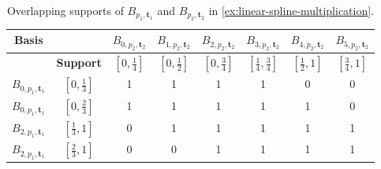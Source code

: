 \begin{example}
    \begin{table}[H]
        \centering
        \begin{tabular}{c|c||c|c|c|c|c|c}
            \textbf{Basis} &  & $B_{0, p_2, \mathbf{t}_2}$ & $B_{1, p_2, \mathbf{t}_2}$ & $B_{2, p_2, \mathbf{t}_2}$ & $B_{3, p_2, \mathbf{t}_2}$ & $B_{4, p_2, \mathbf{t}_2}$ & $B_{5, p_2, \mathbf{t}_2}$ \\[5pt]
            \hline
            \rule{0pt}{2.5ex} & \textbf{Support} & $\left[0, \frac{1}{4}\right]$ & $\left[0, \frac{1}{2}\right]$ & $\left[0, \frac{3}{4}\right]$ & $\left[\frac{1}{4}, \frac{3}{4}\right]$ & $\left[\frac{1}{2}, 1\right]$ & $\left[\frac{3}{4}, 1\right]$ \\[5pt]
            \hline\hline
            \rule{0pt}{2.5ex}$B_{0, p_1, \mathbf{t}_1}$ & $\left[0, \frac{1}{3}\right]$ & 
            1 & 1 & 1 & 1 & 0 & 0 \\[5pt]\hline\rule{0pt}{2.5ex}
            $B_{0, p_1, \mathbf{t}_1}$ & $\left[0, \frac{2}{3}\right]$ &
            1 & 1 & 1 & 1 & 1 & 0 \\[5pt]\hline\rule{0pt}{2.5ex}
            $B_{2, p_1, \mathbf{t}_1}$ & $\left[\frac{1}{3}, 1\right]$ &
            0 & 1 & 1 & 1 & 1 & 1 \\[5pt]\hline\rule{0pt}{2.5ex}
            $B_{2, p_1, \mathbf{t}_1}$ & $\left[\frac{2}{3}, 1\right]$ & 
            0 & 0 & 1 & 1 & 1 & 1 \\[5pt]
        \end{tabular}
        \caption{Overlapping supports of $B_{p_1, \mathbf{t}_1}$ and $B_{p_2, \mathbf{t}_2}$ in \cref{ex:linear-spline-multiplication}.}
        \label{tab:ex-spline-supports}
    \end{table}
\end{example}

